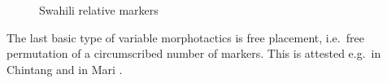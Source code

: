 \documentclass[output=paper
 	        ,biblatex
                ,babelshorthands
                ,newtxmath
                ,draftmode
                ,colorlinks, citecolor=brown
]{langscibook}
\begin{document}
\begin{exe}
\begin{xlist}
\begin{exe}
\begin{xlist}
\begin{figure}[htb]
  \centering
  
\caption{Swahili relative markers}\label{fig:SwahiliRel}
\end{figure}


The last basic type of variable morphotactics is free placement,
i.e.\ free permutation of a circumscribed number of
markers. This is attested e.g.\ in Chintang \citep{Bickel07} and in
Mari \citep{Luutonen97}.



\end{xlist}
\end{exe}
\end{xlist}
\end{exe}
\end{document}
